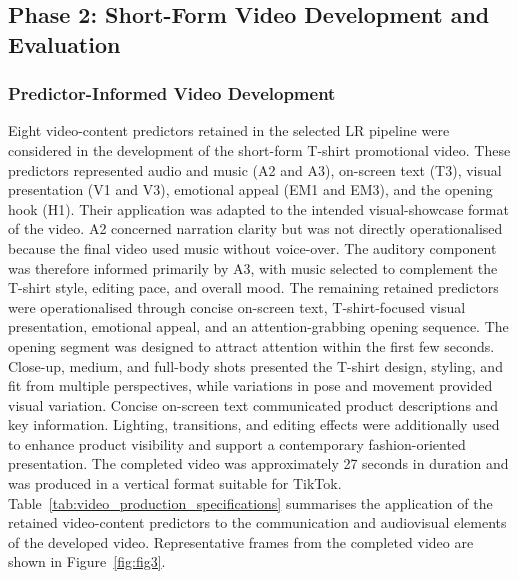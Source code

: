 \documentclass[jtaer,article,submit,moreauthors]{Definitions/mdpi}
\begin{document}
\subsection{Phase 2: Short-Form Video Development and Evaluation}
\label{sec:phase2}
\subsubsection{Predictor-Informed Video Development}

Eight video-content predictors retained in the selected LR pipeline
were considered in the development of the short-form T-shirt
promotional video. These predictors represented audio and music
(A2 and A3), on-screen text (T3), visual presentation (V1 and V3),
emotional appeal (EM1 and EM3), and the opening hook (H1).
Their application was adapted to the intended visual-showcase format
of the video.
A2 concerned narration clarity but was not directly operationalised
because the final video used music without voice-over. The auditory
component was therefore informed primarily by A3, with music selected
to complement the T-shirt style, editing pace, and overall mood.
The remaining retained predictors were operationalised through concise
on-screen text, T-shirt-focused visual presentation, emotional appeal,
and an attention-grabbing opening sequence.
The opening segment was designed to attract attention within the first
few seconds. Close-up, medium, and full-body shots presented the
T-shirt design, styling, and fit from multiple perspectives, while
variations in pose and movement provided visual variation. Concise
on-screen text communicated product descriptions and key information.
Lighting, transitions, and editing effects were additionally used to
enhance product visibility and support a contemporary fashion-oriented
presentation. The completed video was approximately 27 seconds in
duration and was produced in a vertical format suitable for TikTok.
Table~\ref{tab:video_production_specifications} summarises the
application of the retained video-content predictors to the
communication and audiovisual elements of the developed video.
Representative frames from the completed video are shown in
Figure~\ref{fig:fig3}.
\end{document}
